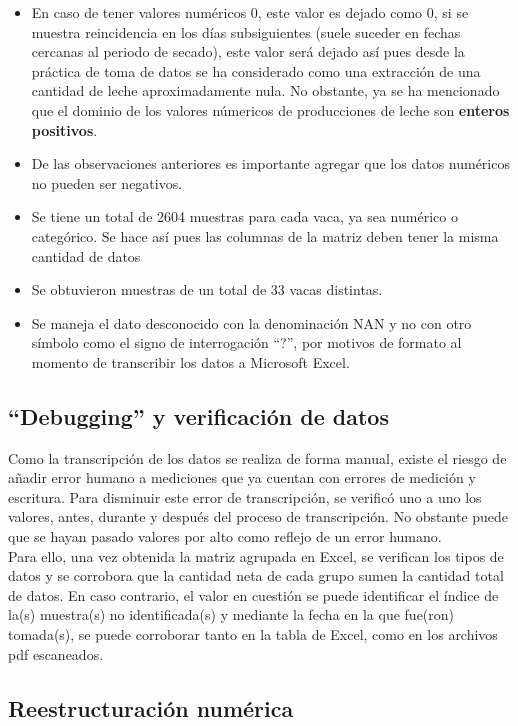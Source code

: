 \begin{itemize}
    \item En caso de tener valores numéricos 0, este valor es dejado como 0, si se muestra reincidencia en los días subsiguientes (suele suceder en fechas cercanas al periodo de secado), este valor será dejado así pues desde la práctica de toma de datos se ha considerado como una extracción de una cantidad de leche aproximadamente nula. No obstante, ya se ha mencionado que el dominio de los valores númericos de producciones de leche son \textbf{enteros positivos}.
    \item De las observaciones anteriores es importante agregar que los datos numéricos no pueden ser negativos.
    \item Se tiene un total de 2604 muestras para cada vaca, ya sea numérico o categórico. Se hace así pues las columnas de la matriz deben tener la misma cantidad de datos
    \item Se obtuvieron muestras de un total de 33 vacas distintas.
    \item Se maneja el dato desconocido con la denominación NAN y no con otro símbolo como el signo de interrogación ``?'', por motivos de formato al momento de transcribir los datos a Microsoft Excel.
\end{itemize}

\subsection{``Debugging'' y verificación de datos}

Como la transcripción de los datos se realiza de forma manual, existe el riesgo de añadir error humano a mediciones que ya cuentan con errores de medición y escritura. Para disminuir este error de transcripción, se verificó uno a uno los valores, antes, durante y después del proceso de transcripción. No obstante puede que se hayan pasado valores por alto como reflejo de un error humano.\\

Para ello, una vez obtenida la matriz agrupada en Excel, se verifican los tipos de datos y se corrobora que la cantidad neta de cada grupo sumen la cantidad total de datos. En caso contrario, el valor en cuestión se puede identificar el índice de la(s) muestra(s) no identificada(s) y mediante la fecha en la que fue(ron)  tomada(s), se puede corroborar tanto en la tabla de Excel, como en los archivos pdf escaneados. 

\subsection{Reestructuración numérica}

